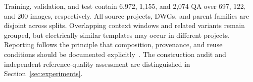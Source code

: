 Training, validation, and test contain 6,972, 1,155, and 2,074 QA over 697, 122, and 200 images, respectively. All source projects, DWGs, and parent families are disjoint across splits. Overlapping context windows and related variants remain grouped, but electrically similar templates may occur in different projects. Reporting follows the principle that composition, provenance, and reuse conditions should be documented explicitly~\cite{gebru2021datasheets}. The construction audit and independent reference-quality assessment are distinguished in Section~\ref{sec:experiments}.
